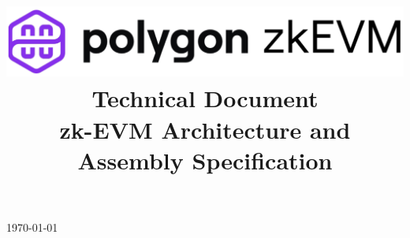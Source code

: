 \documentclass[preprint]{iacrtrans}
\title{
    \includegraphics[width=\columnwidth]{logo_zkEVM.png} 	\\ \vspace{0.3cm}
    Technical Document 										\\ \vspace{0.3cm}	
    zk-EVM Architecture and Assembly Specification \vspace{0.3cm}
    \version
}
\institute{}
\begin{document}
    
    
\begin{titlepage}
    \centering
    \maketitle
    \today
    \vspace{-5mm}
\end{titlepage}


{\hypersetup{linkcolor=.}\tableofcontents}

\newpage







%
%
\end{document}
